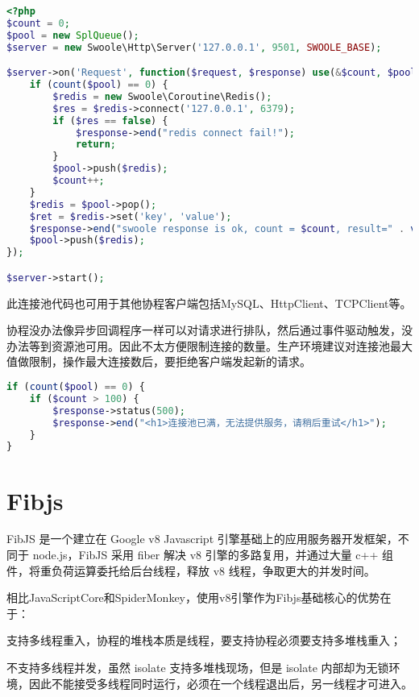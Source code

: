 \begin{lstlisting}[language=PHP]
<?php
$count = 0;
$pool = new SplQueue();
$server = new Swoole\Http\Server('127.0.0.1', 9501, SWOOLE_BASE);

$server->on('Request', function($request, $response) use(&$count, $pool) {
    if (count($pool) == 0) {
        $redis = new Swoole\Coroutine\Redis();
        $res = $redis->connect('127.0.0.1', 6379);
        if ($res == false) {
            $response->end("redis connect fail!");
            return;
        }
        $pool->push($redis);
        $count++;
    }
    $redis = $pool->pop();
    $ret = $redis->set('key', 'value');
    $response->end("swoole response is ok, count = $count, result=" . var_export($ret, true));
    $pool->push($redis);
});

$server->start();
\end{lstlisting}

此连接池代码也可用于其他协程客户端包括MySQL、HttpClient、TCPClient等。

协程没办法像异步回调程序一样可以对请求进行排队，然后通过事件驱动触发，没办法等到资源池可用。因此不太方便限制连接的数量。生产环境建议对连接池最大值做限制，操作最大连接数后，要拒绝客户端发起新的请求。


\begin{lstlisting}[language=PHP]
if (count($pool) == 0) {
    if ($count > 100) {
        $response->status(500);
        $response->end("<h1>连接池已满，无法提供服务，请稍后重试</h1>");
    }
}
\end{lstlisting}


\section{Fibjs}


FibJS 是一个建立在 Google v8 Javascript 引擎基础上的应用服务器开发框架，不同于 node.js，FibJS 采用 fiber 解决 v8 引擎的多路复用，并通过大量 c++ 组件，将重负荷运算委托给后台线程，释放 v8 线程，争取更大的并发时间。

相比JavaScriptCore和SpiderMonkey，使用v8引擎作为Fibjs基础核心的优势在于：

\begin{compactitem}
\item 支持多线程重入，协程的堆栈本质是线程，要支持协程必须要支持多堆栈重入；
\item 不支持多线程并发，虽然 isolate 支持多堆栈现场，但是 isolate 内部却为无锁环境，因此不能接受多线程同时运行，必须在一个线程退出后，另一线程才可进入。
\end{compactitem}


